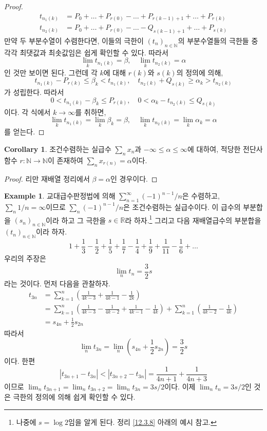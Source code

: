 \documentclass[11pt]{book}
\numberwithin{equation}{chapter}
\def\NN{\mathbb{N}}
\def\RR{\mathbb{R}}
\newcommand{\abs}[1]{\left\vert#1\right\vert}
\newcommand{\paren}[1]{\left(#1\right)}
\theoremstyle{definition}
\newtheorem{cor}[thm]{Corollary}
\newtheorem*{ex}{Example}
\begin{document}
\begin{proof}
    \begin{align*}
        t_{n_1(k)} &= P_0 + \ldots + P_{r(0)} - \ldots + P_{r(k-1)+1} + \ldots + P_{r(k)}\\
        t_{n_2(k)} &= P_0 + \ldots + P_{r(0)} - \ldots - Q_{s(k-1)+1} + \ldots + P_{s(k)}
    \end{align*}
    만약 두 부분수열이 수렴한다면, 이들의 극한이 \((t_n)_{n \in \NN}\)의 부분수열들의 극한들 중 각각 최댓값과 최솟값임은 쉽게 확인할 수 있다. 따라서
    \[
    \lim_k t_{n_1(k)}  = \beta, \quad \lim_k t_{n_2(k)}  = \alpha
    \]
    인 것만 보이면 된다. 그런데 각 \(k\)에 대해 \(r(k)\)와 \(s(k)\)의 정의에 의해,
    \[
        t_{n_1(k)} - P_{r(k)} \le \beta_k < t_{n_1(k)}, \quad t_{n_2(k)} + Q_{s(k)} \ge \alpha_k > t_{n_2(k)}
    \]
    가 성립한다. 따라서
    \[
        0 <  t_{n_1(k)} - \beta_k \le P_{r(k)}, \quad 0 < \alpha_k - t_{n_2(k)} \le Q_{s(k)}
    \]
    이다. 각 식에서 \(k \to \infty\)를 취하면,
    \[
    \lim_k t_{n_1(k)} = \lim_k \beta_k = \beta, \quad \lim_k t_{n_2(k)} = \lim_k \alpha_k = \alpha    
    \]
    를 얻는다.
\end{proof}

\begin{cor}
    조건수렴하는 실급수 \(\sum_n x_n\)과 \(- \infty \le \alpha \le \infty\)에 대하여, 적당한 전단사함수 \(r : \NN \to \NN\)이 존재하여 \(\sum_n x_{r(n)} = \alpha\)이다.
\end{cor}
\begin{proof}
    리만 재배열 정리에서 \(\beta = \alpha\)인 경우이다.
\end{proof}

\begin{ex}
    교대급수판정법에 의해 \(\sum_{n=1}^\infty (-1)^{n-1}/n\)은 수렴하고, \(\sum_n 1/n = \infty\)이므로 \(\sum_n (-1)^{n-1}/n\)은 조건수렴하는 실급수이다. 이 급수의 부분합을 \((s_n)_{n \in \NN}\)이라 하고 그 극한을 \(s \in \RR\)라 하자.\footnote{나중에 \(s = \log 2\)임을 알게 된다. 정리 \ref{12.3.8} 아래의 예시 참고.} 그리고 다음 재배열급수의 부분합을 \((t_n)_{n \in \NN}\)이라 하자.
    \[
        1 + \frac{1}{3} - \frac{1}{2} + \frac{1}{5} + \frac{1}{7} - \frac{1}{4} + \frac{1}{9} +\frac{1}{11} - \frac{1}{6} + \ldots    
    \]
    우리의 주장은
    \[
    \lim_n t_n = \frac{3}{2}s    
    \]
    라는 것이다. 먼저 다음을 관찰하자.
    \begin{align*}
        t_{3n} &= \sum_{k=1}^n \paren{\frac{1}{4k-3} + \frac{1}{4k-1} - \frac{1}{2k}}\\
        &= \sum_{k=1}^n \paren{\frac{1}{4k-3} - \frac{1}{4k-2} + \frac{1}{4k-1} - \frac{1}{4k}} + \sum_{k=1}^n \paren{\frac{1}{4k-2} - \frac{1}{4k}}\\
        &= s_{4n} + \frac{1}{2}s_{2n}
    \end{align*}
    따라서
    \[
    \lim_n t_{3n} = \lim_n \paren{s_{4n} + \frac{1}{2}s_{2n}} = \frac{3}{2}s    
    \]
    이다. 한편
    \[
    \abs{t_{3n+1} - t_{3n}} < \abs{t_{3n+2} - t_{3n}} = \frac{1}{4n+1} + \frac{1}{4n+3}    
    \]
    이므로 \(\lim_n t_{3n+1} = \lim_n t_{3n+2} = \lim_n t_{3n} = 3s/2\)이다. 이제 \(\lim_n t_n = 3s/2\)인 것은 극한의 정의에 의해 쉽게 확인할 수 있다.
\end{ex}
\end{document}
